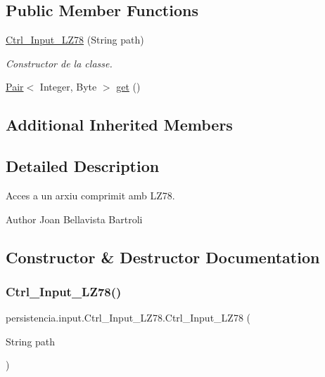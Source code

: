 \subsection*{Public Member Functions}
\begin{DoxyCompactItemize}
\item 
\hyperlink{classpersistencia_1_1input_1_1Ctrl__Input__LZ78_a3629302a8c1eb2b0c7367ad0ea542780}{Ctrl\+\_\+\+Input\+\_\+\+L\+Z78} (String path)
\begin{DoxyCompactList}\small\item\em Constructor de la classe. \end{DoxyCompactList}\item 
\hyperlink{classdomini_1_1utils_1_1Pair}{Pair}$<$ Integer, Byte $>$ \hyperlink{classpersistencia_1_1input_1_1Ctrl__Input__LZ78_ae09535962f284be3a76369845c15b78c}{get} ()
\end{DoxyCompactItemize}
\subsection*{Additional Inherited Members}


\subsection{Detailed Description}
Acces a un arxiu comprimit amb L\+Z78. 

\begin{DoxyAuthor}{Author}
Joan Bellavista Bartroli 
\end{DoxyAuthor}


\subsection{Constructor \& Destructor Documentation}
\mbox{\label{classpersistencia_1_1input_1_1Ctrl__Input__LZ78_a3629302a8c1eb2b0c7367ad0ea542780}} 
\subsubsection{\texorpdfstring{Ctrl\+\_\+\+Input\+\_\+\+L\+Z78()}{Ctrl\_Input\_LZ78()}}
{\footnotesize\ttfamily persistencia.\+input.\+Ctrl\+\_\+\+Input\+\_\+\+L\+Z78.\+Ctrl\+\_\+\+Input\+\_\+\+L\+Z78 (\begin{DoxyParamCaption}\item[{String}]{path }\end{DoxyParamCaption})\hspace{0.3cm}{\ttfamily [inline]}}



